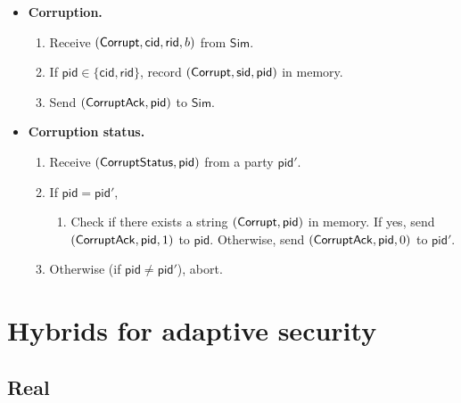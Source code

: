 \documentclass[11pt,letterpaper]{article}
\newcommand{\doclearpage}{%
  \iffull\clearpage\else\fi
}
\theoremstyle{plain} %
\theoremstyle{definition} %
\theoremstyle{remark} %
\newcommand{\Simulator}{{\mathsf{Sim}}} %
\newcommand{\sid}{\mathsf{sid}}
\newcommand{\CommitterId}{\mathsf{cid}}
\newcommand{\ReceiverId}{\mathsf{rid}}
\newcommand{\CommBit}{b}
\begin{document}
\begin{mdframed}
\begin{itemize}
\begin{itemize}
\item \textbf{Corruption.}
\newcommand{\pid}{\mathsf{pid}}
\begin{enumerate}[nolistsep]
\item Receive $(\CorruptMsg, \CommitterId, \ReceiverId, \CommBit)$ from $\Simulator$.
\item If $\pid \in \{\CommitterId, \ReceiverId\}$, record $(\CorruptMsg, \sid, \pid)$ in memory.
\item Send $(\CorruptAckMsg, \pid)$ to $\Simulator$.
\end{enumerate}

\item \textbf{Corruption status.}
\begin{enumerate}[nolistsep]
\item Receive $(\CorruptStatusReqMsg, \pid)$ from a party $\pid'$.
\item If $\pid = \pid'$,
\begin{enumerate}
    \item Check if there exists a string $(\CorruptMsg, \pid)$ in memory. If yes, send $(\CorruptAckMsg, \pid, 1)$ to $\pid$. Otherwise, send $(\CorruptAckMsg, \pid, 0)$ to $\pid'$.
\end{enumerate}
\item Otherwise (if $\pid \ne \pid'$), abort.
\end{enumerate}
\end{itemize}
\end{itemize}
\end{mdframed}


\doclearpage
\section{Hybrids for adaptive security}
\label{sec:hybrids-adaptive}

\subsection{Real}
\label{sec:real-distr}
\end{document}
